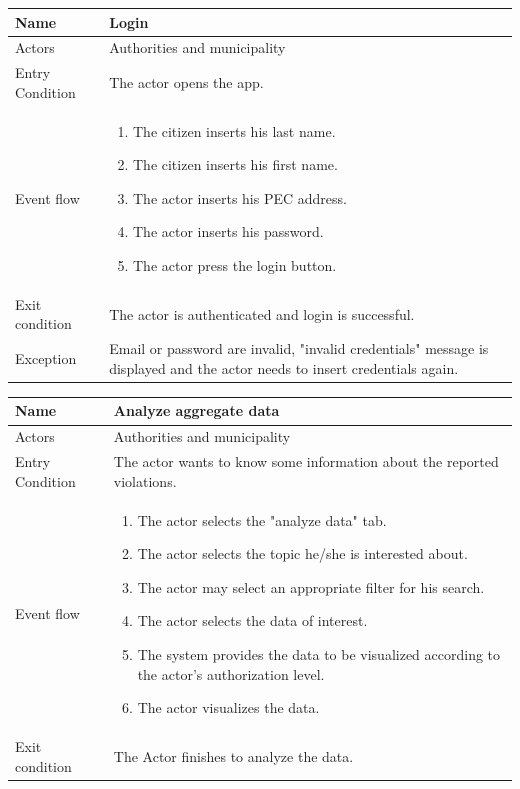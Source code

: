 \vskip 0.2in
\begin{tabular}{|p{3.1cm}|p{11.6cm}|}
\hline
Name & Login\\
\hline
Actors & Authorities and municipality\\
\hline
Entry Condition & The actor opens the app.\\
\hline
Event flow & \begin{enumerate}
				\item The citizen inserts his last name.
				\item The citizen inserts his first name.
                \item The actor inserts his PEC address.
                \item The actor inserts his password.
                \item The actor press the login button.
            \end{enumerate}\\
\hline
Exit condition & The actor is authenticated and login is successful.\\
\hline
Exception & Email or password are invalid, "invalid credentials" message is displayed and the actor needs to insert credentials again.\\
\hline
\end{tabular}

\vskip 0.2in
\begin{tabular}{|p{3.1cm}|p{11.6cm}|}
\hline
Name & Analyze aggregate data\\
\hline
Actors & Authorities and municipality\\
\hline
Entry Condition & The actor wants to know some information about the reported violations.\\
\hline
Event flow & \begin{enumerate}
                \item The actor selects the "analyze data" tab.
                \item The actor selects the topic he/she is interested about.
                \item The actor may select an appropriate filter for his search.
                \item The actor selects the data of interest.
                \item The system provides the data to be visualized according to the actor's authorization level.
                \item The actor visualizes the data.
            \end{enumerate}\\
\hline
Exit condition & The Actor finishes to analyze the data.\\
\hline
\end{tabular}

